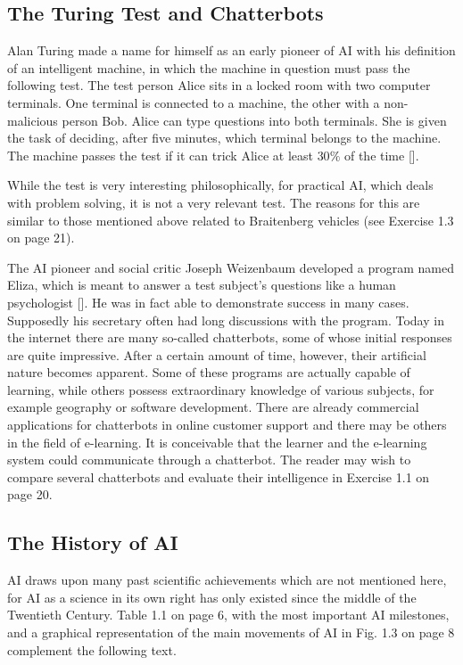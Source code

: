 \documentclass[10pt]{book}
\begin{document}
\subsection{The Turing Test and Chatterbots}
Alan Turing made a name for himself as an early pioneer of AI with his definition of an intelligent machine, in which the machine in question must pass the following test. The test person Alice sits in a locked room with two computer terminals. One terminal is connected to a machine, the other with a non-malicious person Bob. Alice can type questions into both terminals. She is given the task of deciding, after five minutes, which terminal belongs to the machine. The machine passes the test if it can trick Alice at least $30 \%$ of the time [\cite{tur50}].

While the test is very interesting philosophically, for practical AI, which deals with problem solving, it is not a very relevant test. The reasons for this are similar to those mentioned above related to Braitenberg vehicles (see Exercise 1.3 on page 21).

The AI pioneer and social critic Joseph Weizenbaum developed a program named Eliza, which is meant to answer a test subject's questions like a human psychologist [\cite{wei66}]. He was in fact able to demonstrate success in many cases. Supposedly his secretary often had long discussions with the program. Today in the internet there are many so-called chatterbots, some of whose initial responses are quite impressive. After a certain amount of time, however, their artificial nature becomes apparent. Some of these programs are actually capable of learning, while others possess extraordinary knowledge of various subjects, for example geography or software development. There are already commercial applications for chatterbots in online customer support and there may be others in the field of e-learning. It is conceivable that the learner and the e-learning system could communicate through a chatterbot. The reader may wish to compare several chatterbots and evaluate their intelligence in Exercise 1.1 on page 20.

\subsection{The History of AI}
AI draws upon many past scientific achievements which are not mentioned here, for AI as a science in its own right has only existed since the middle of the Twentieth Century. Table 1.1 on page 6, with the most important AI milestones, and a graphical representation of the main movements of AI in Fig. 1.3 on page 8 complement the following text.
\end{document}
